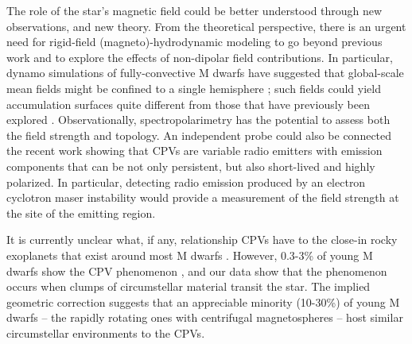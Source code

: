 \documentclass{nature3}
\begin{document}
The role of the star's magnetic field could be better understood through
new observations, and new theory.  From the theoretical perspective,
there is an urgent need for rigid-field (magneto)-hydrodynamic modeling
to go beyond previous work \cite{Townsend2005,Townsend2008} and to
explore the effects of non-dipolar field contributions.  In particular,
dynamo simulations of fully-convective M dwarfs have suggested that
global-scale mean fields might be confined to a single hemisphere
\cite{Brown2020}; such fields could yield accumulation surfaces quite
different from those that have previously been explored
\cite{Townsend2008}.  Observationally, spectropolarimetry has the
potential to assess both the field strength and topology.  An
independent probe could also be connected the recent work
\cite{Kaur2024} showing that CPVs are variable radio emitters with
emission components that can be not only persistent, but also
short-lived and highly polarized.  In particular, detecting radio
emission produced by an electron cyclotron maser instability
\cite{Callingham2021} would provide a measurement of the field
strength at the site of the emitting region.


It is currently unclear what, if any, relationship CPVs have to the
close-in rocky exoplanets that exist around most M dwarfs \cite{Dressing2015}.
However, 0.3-3\% of young M dwarfs show the CPV phenomenon
\cite{Rebull2020}, and our data show that the phenomenon occurs when
clumps of circumstellar material transit the star.  The implied
geometric correction suggests that an appreciable minority (10-30\%) of
young M dwarfs -- the rapidly rotating ones with centrifugal
magnetospheres -- host similar circumstellar environments to the CPVs.




\end{document}
